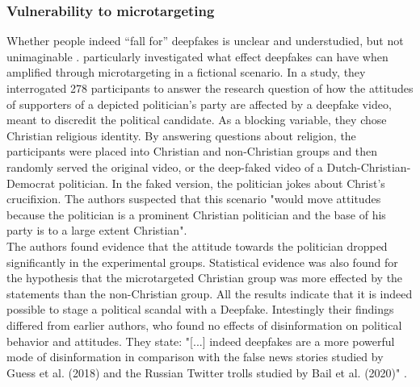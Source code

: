 \documentclass[
  a4paper,  %
  twoside,  %
  bibliography=totoc,
  headsepline,
  cleardoublepage=empty,
  parskip=half,
  draft=false
]{scrbook}
\begin{document}
\subsubsection*{Vulnerability to microtargeting}
Whether people indeed “fall for” deepfakes is unclear and understudied, but not unimaginable \cite{dobberMicrotargetedDeepfakesHave2021}. \citet{dobberMicrotargetedDeepfakesHave2021} particularly investigated what effect deepfakes can have when amplified through microtargeting in a fictional scenario. In a study, they interrogated 278 participants to answer the research question of how the attitudes of supporters of a depicted politician's party are affected by a deepfake video, meant to discredit the political candidate. As a blocking variable, they chose Christian religious identity. By answering questions about religion, the participants were placed into Christian and non-Christian groups and then randomly served the original video, or the deep-faked video of a Dutch-Christian-Democrat politician. In the faked version, the politician jokes about Christ's crucifixion. The authors suspected that this scenario "would move attitudes because the politician is a prominent Christian politician and the base of his party is to a large extent Christian". \\
The authors found evidence that the attitude towards the politician dropped significantly in the experimental groups.
Statistical evidence was also found for the hypothesis that the microtargeted Christian group was more effected by the statements than the non-Christian group. All the results indicate that it is indeed possible to stage a political scandal with a Deepfake. Intestingly their findings differed from earlier authors, who found no effects of disinformation on political behavior and attitudes. They state: "[...] indeed deepfakes are a more powerful mode of disinformation in comparison with the false news stories studied by Guess et al. (2018) and the Russian Twitter trolls studied by Bail et al. (2020)" \cite{dobberMicrotargetedDeepfakesHave2021}.
\end{document}

